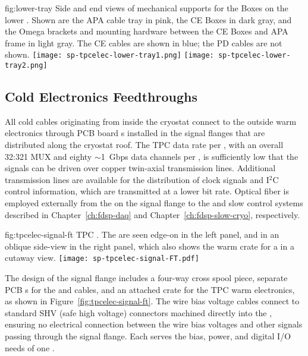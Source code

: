 \begin{dunefigure}
{fig:lower-tray}
{Side and end views of mechanical supports for the  Boxes on the lower . Shown are 
the APA cable tray in pink, the CE Boxes in dark gray, and the Omega brackets and mounting hardware 
between the CE Boxes and APA frame in light gray. The CE cables are shown in blue; the PD cables are not shown.}
\texttt{[image: sp-tpcelec-lower-tray1.png]}
\texttt{[image: sp-tpcelec-lower-tray2.png]}
\end{dunefigure}

\subsection{Cold Electronics Feedthroughs}
\label{sec:fdsp-tpcelec-design-ft}

All cold cables originating from inside the cryostat connect to the outside warm electronics through PCB board \fdth{}s
installed in the signal flanges that are distributed along the cryostat roof.
The TPC data rate per , with an overall \num{32}:\num{321} MUX and eighty $\sim$1~Gbps data channels per ,
is sufficiently low that the  signals can be driven over copper twin-axial transmission lines.
Additional transmission lines are available for the distribution of  clock signals and I$^2$C control information,
which are transmitted at a lower bit rate.
Optical fiber is employed externally from the  on the signal flange to the  and slow control systems described in Chapter~\ref{ch:fdsp-daq} and Chapter~\ref{ch:fdsp-slow-cryo}, respectively.

\begin{dunefigure}
{fig:tpcelec-signal-ft}
{TPC  \fdth. The  are seen edge-on in the left panel, and in an oblique side-view in the right panel, which also shows the warm crate for a  %
in a cutaway view.}
\texttt{[image: sp-tpcelec-signal-FT.pdf]}
\end{dunefigure}

The design of the signal flange includes a four-way cross spool piece, separate PCB \fdth{}s for the  and  cables, and
an attached crate for the TPC warm electronics, as shown in Figure~\ref{fig:tpcelec-signal-ft}.
The wire bias voltage cables connect to standard SHV (safe high voltage) connectors machined directly into the  \fdth,
ensuring no electrical connection between the wire bias voltages and other signals passing through the signal flange.
Each  \fdth serves the bias, power, and digital I/O needs of one .  

